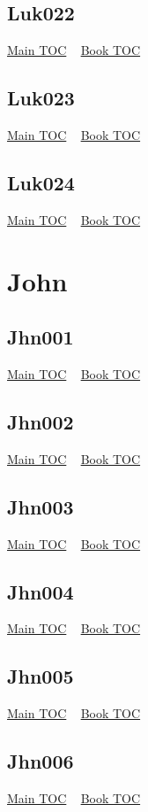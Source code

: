 \documentclass{book}
\begin{document}
  \section{Luk022}\hyperlink{toc}{Main TOC} ~ \hyperref[subsec:Luk]{Book TOC} 
  \section{Luk023}\hyperlink{toc}{Main TOC} ~ \hyperref[subsec:Luk]{Book TOC} 
  \section{Luk024}\hyperlink{toc}{Main TOC} ~ \hyperref[subsec:Luk]{Book TOC} 
  \chapter{John} \label{subsec:Jhn} \begin{multicols}{2} \minitoc \end{multicols}
  \section{Jhn001}\hyperlink{toc}{Main TOC} ~ \hyperref[subsec:Jhn]{Book TOC} 
  \section{Jhn002}\hyperlink{toc}{Main TOC} ~ \hyperref[subsec:Jhn]{Book TOC} 
  \section{Jhn003}\hyperlink{toc}{Main TOC} ~ \hyperref[subsec:Jhn]{Book TOC} 
  \section{Jhn004}\hyperlink{toc}{Main TOC} ~ \hyperref[subsec:Jhn]{Book TOC} 
  \section{Jhn005}\hyperlink{toc}{Main TOC} ~ \hyperref[subsec:Jhn]{Book TOC} 
  \section{Jhn006}\hyperlink{toc}{Main TOC} ~ \hyperref[subsec:Jhn]{Book TOC} 
\end{document}
